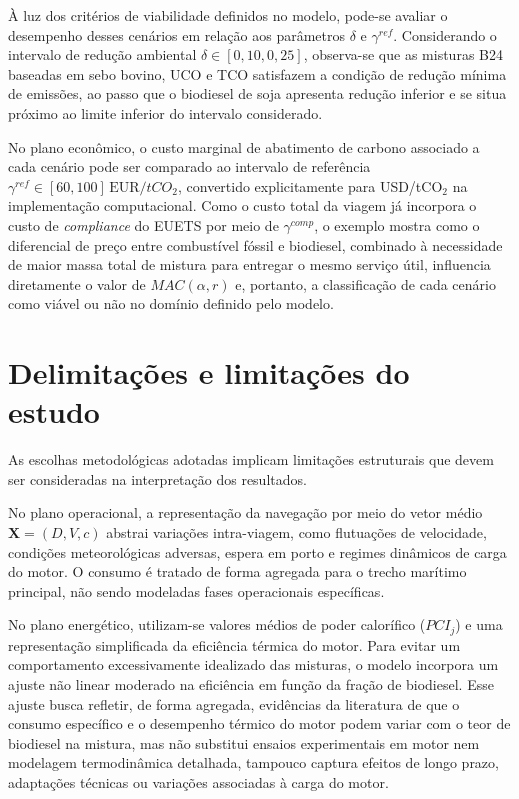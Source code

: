 À luz dos critérios de viabilidade definidos no modelo, pode-se avaliar o desempenho desses cenários em relação aos parâmetros $\delta$ e $\gamma^{ref}$. Considerando o intervalo de redução ambiental $\delta \in [0,10,0,25]$, observa-se que as misturas \gls{B24} baseadas em sebo bovino, \gls{UCO} e \gls{TCO} satisfazem a condição de redução mínima de emissões, ao passo que o biodiesel de soja apresenta redução inferior e se situa próximo ao limite inferior do intervalo considerado.

No plano econômico, o custo marginal de abatimento de carbono associado a cada cenário pode ser comparado ao intervalo de referência $\gamma^{ref} \in [60,100]\,\text{EUR}/tCO_2$, convertido explicitamente para USD/tCO$_2$ na implementação computacional. Como o custo total da viagem já incorpora o custo de \emph{compliance} do \gls{EUETS} por meio de $\gamma^{comp}$, o exemplo mostra como o diferencial de preço entre combustível fóssil e biodiesel, combinado à necessidade de maior massa total de mistura para entregar o mesmo serviço útil, influencia diretamente o valor de $MAC(\alpha,r)$ e, portanto, a classificação de cada cenário como viável ou não no domínio definido pelo modelo.

\section{Delimitações e limitações do estudo}

As escolhas metodológicas adotadas implicam limitações estruturais que devem ser consideradas na interpretação dos resultados.

No plano operacional, a representação da navegação por meio do vetor médio $\mathbf{X} = (D,V,c)$ abstrai variações intra-viagem, como flutuações de velocidade, condições meteorológicas adversas, espera em porto e regimes dinâmicos de carga do motor. O consumo é tratado de forma agregada para o trecho marítimo principal, não sendo modeladas fases operacionais específicas.

No plano energético, utilizam-se valores médios de poder calorífico ($PCI_j$) e uma representação simplificada da eficiência térmica do motor. Para evitar um comportamento excessivamente idealizado das misturas, o modelo incorpora um ajuste não linear moderado na eficiência em função da fração de biodiesel. Esse ajuste busca refletir, de forma agregada, evidências da literatura de que o consumo específico e o desempenho térmico do motor podem variar com o teor de biodiesel na mistura, mas não substitui ensaios experimentais em motor nem modelagem termodinâmica detalhada, tampouco captura efeitos de longo prazo, adaptações técnicas ou variações associadas à carga do motor.


